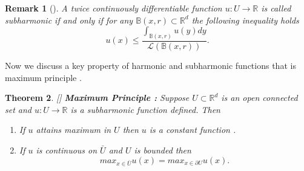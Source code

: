 \documentclass[11pt, a4paper, oneside]{report}
\numberwithin{equation}{section}
\newtheorem{theorem}{Theorem}[chapter]
\newtheorem{remark}[theorem]{Remark}
\begin{document}
\begin{remark}[{\cite[Remark 3.4]{PeresMortersBook}}]
A twice continuously differentiable function \(u : U \to \mathbb{R}\) is called subharmonic if and only if for any \(\mathbb{B}(x,r) \subset \mathbb{R}^d\) the following inequality holds
\[
u(x) \leq \frac{\int_{\mathbb{B}(x,r)} u(y)dy}{\mathscr{L}(\mathbb{B}(x,r))}
.\]
\end{remark}
\noindent Now we discuss a key property of harmonic and subharmonic functions that is maximum principle .
\begin{theorem}\label{maximum}
[{\cite[Theorem 3.5]{PeresMortersBook}}]
\textbf{Maximum Principle :} Suppose \(U \subset \mathbb{R}^d\) is an open connected set and \(u : U \to \mathbb{R}\) is a subharmonic function defined. Then 
\begin{enumerate}
  \item If \(u\) attains maximum in \(U\) then \(u\) is a constant function .
 \item If \(u\) is continuous on \(\bar{U}\) and \(U\) is bounded then
 \[
 max_{x \in \bar{U}} u(x) =  max_{x \in \partial{U}} u(x)
. \]  
\end{enumerate}
\end{theorem}
\end{document}
